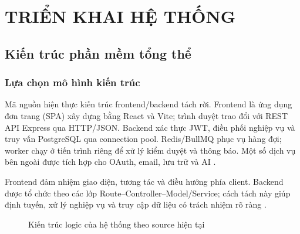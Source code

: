 \chapter{TRIỂN KHAI HỆ THỐNG}
\label{chap:implementation}

\section{Kiến trúc phần mềm tổng thể}

\subsection{Lựa chọn mô hình kiến trúc}

Mã nguồn hiện thực kiến trúc frontend/backend tách rời. Frontend là ứng dụng đơn trang (SPA) xây dựng bằng React và Vite; trình duyệt trao đổi với REST API Express qua HTTP/JSON. Backend xác thực JWT, điều phối nghiệp vụ và truy vấn PostgreSQL qua connection pool. Redis/BullMQ phục vụ hàng đợi; worker chạy ở tiến trình riêng để xử lý kiểm duyệt và thông báo. Một số dịch vụ bên ngoài được tích hợp cho OAuth, email, lưu trữ và AI \cite{architecture,react-docs,vite-docs}.

Frontend đảm nhiệm giao diện, tương tác và điều hướng phía client. Backend được tổ chức theo các lớp Route--Controller--Model/Service; cách tách này giúp định tuyến, xử lý nghiệp vụ và truy cập dữ liệu có trách nhiệm rõ ràng \cite{express-docs}.

\begin{figure}[H]
\centering
{}
\caption{Kiến trúc logic của hệ thống theo source hiện tại}
\label{fig:overall-architecture}
\end{figure}

